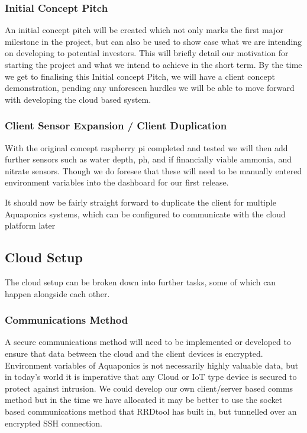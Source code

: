\documentclass[11pt, oneside, a4paper, titlepage]{article}
\begin{document}
\subsubsection{Initial Concept Pitch}
An initial concept pitch will be created which not only marks the first major milestone in the project, but can also be used to show case what we are intending on developing to potential investors.   This will briefly detail our motivation for starting the project and what we intend to achieve in the short term.  By the time we get to finalising this Initial concept Pitch, we will have a client concept demonstration, pending any unforeseen hurdles we will be able to move forward with developing the cloud based system.  

\subsubsection{Client Sensor Expansion / Client Duplication}
With the original concept raspberry pi completed and tested we will then add further sensors such as water depth, ph, and if financially viable ammonia, and nitrate sensors. Though we do foresee that these will need to be manually entered environment variables into the dashboard for our first release. 

It should now be fairly straight forward to duplicate the client for multiple Aquaponics systems, which can be configured to communicate with the cloud platform later 

\subsection{Cloud Setup}
The cloud setup can be broken down into further tasks, some of which can happen alongside each other. 

\subsubsection{Communications Method}
A secure communications method will need to be implemented or developed to ensure that data between the cloud and the client devices is encrypted.  Environment variables of Aquaponics is not necessarily highly valuable data, but in today's world it is imperative that any Cloud or IoT type device is secured to protect against intrusion.  We could  develop our own client/server based comms method but in the time we have allocated it may be better to use the socket based communications method that RRDtool has built in, but tunnelled over an encrypted SSH connection. 
\end{document}
